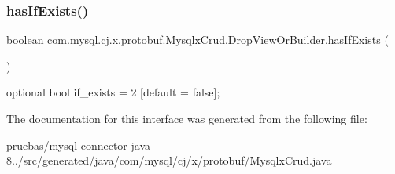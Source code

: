 \subsubsection{\texorpdfstring{has\+If\+Exists()}{hasIfExists()}}
{\footnotesize\ttfamily boolean com.\+mysql.\+cj.\+x.\+protobuf.\+Mysqlx\+Crud.\+Drop\+View\+Or\+Builder.\+has\+If\+Exists (\begin{DoxyParamCaption}{ }\end{DoxyParamCaption})}

{\ttfamily optional bool if\+\_\+exists = 2 \mbox{[}default = false\mbox{]};} 

The documentation for this interface was generated from the following file\+:\begin{DoxyCompactItemize}
\item 
pruebas/mysql-\/connector-\/java-\/8../src/generated/java/com/mysql/cj/x/protobuf/Mysqlx\+Crud.\+java\end{DoxyCompactItemize}
